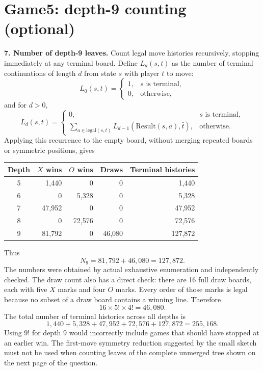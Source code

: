 \documentclass[11pt,a4paper]{article}
\begin{document}
\newpage
\section*{Game5: depth-9 counting (optional)}
\textbf{7. Number of depth-9 leaves.} Count legal move histories recursively, stopping immediately at any terminal board. Define $L_d(s,t)$ as the number of terminal continuations of length $d$ from state $s$ with player $t$ to move:
\[
L_0(s,t)=\begin{cases}1,&s\text{ is terminal},\\0,&\text{otherwise},\end{cases}
\]
and for $d>0$,
\[
L_d(s,t)=\begin{cases}
0,&s\text{ is terminal},\\
\displaystyle\sum_{a\in\mathrm{legal}(s,t)}L_{d-1}(\mathrm{Result}(s,a),\bar t),&\text{otherwise}.
\end{cases}
\]
Applying this recurrence to the empty board, without merging repeated boards or symmetric positions, gives
\begin{center}\begin{tabular}{c|r|r|r|r}\toprule
Depth&$X$ wins&$O$ wins&Draws&Terminal histories\\\midrule
5&1,440&0&0&1,440\\
6&0&5,328&0&5,328\\
7&47,952&0&0&47,952\\
8&0&72,576&0&72,576\\
9&81,792&0&46,080&127,872\\\bottomrule\end{tabular}\end{center}
Thus
\[
\boxed{N_9=81,792+46,080=127,872}.
\]
The numbers were obtained by actual exhaustive enumeration and independently checked. The draw count also has a direct check: there are 16 full draw boards, each with five $X$ marks and four $O$ marks. Every order of those marks is legal because no subset of a draw board contains a winning line. Therefore
\[
16\times5!\times4!=46,080.
\]
The total number of terminal histories across all depths is
\[
1,440+5,328+47,952+72,576+127,872=255,168.
\]
Using $9!$ for depth 9 would incorrectly include games that should have stopped at an earlier win. The first-move symmetry reduction suggested by the small sketch must not be used when counting leaves of the complete unmerged tree shown on the next page of the question.
\end{document}
